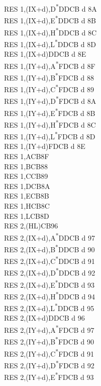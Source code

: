 \documentclass[twoside,openright,a4paper]{book}
\begin{document}
\begin{multicols}{3}
{\begin{tabbing}
	RES 1,(IX+d),D\textsuperscript{*}\>DDCB d 8A\\
	RES 1,(IX+d),E\textsuperscript{*}\>DDCB d 8B\\
	RES 1,(IX+d),H\textsuperscript{*}\>DDCB d 8C\\
	RES 1,(IX+d),L\textsuperscript{*}\>DDCB d 8D\\
	RES 1,(IX+d)\>DDCB d 8E\\
	RES 1,(IY+d),A\textsuperscript{*}\>FDCB d 8F\\
	RES 1,(IY+d),B\textsuperscript{*}\>FDCB d 88\\
	RES 1,(IY+d),C\textsuperscript{*}\>FDCB d 89\\
	RES 1,(IY+d),D\textsuperscript{*}\>FDCB d 8A\\
	RES 1,(IY+d),E\textsuperscript{*}\>FDCB d 8B\\
	RES 1,(IY+d),H\textsuperscript{*}\>FDCB d 8C\\
	RES 1,(IY+d),L\textsuperscript{*}\>FDCB d 8D\\
	RES 1,(IY+d)\>FDCB d 8E\\
	RES 1,A\>CB8F\\
	RES 1,B\>CB88\\
	RES 1,C\>CB89\\
	RES 1,D\>CB8A\\
	RES 1,E\>CB8B\\
	RES 1,H\>CB8C\\
	RES 1,L\>CB8D\\
	RES 2,(HL)\>CB96\\
	RES 2,(IX+d),A\textsuperscript{*}\>DDCB d 97\\
	RES 2,(IX+d),B\textsuperscript{*}\>DDCB d 90\\
	RES 2,(IX+d),C\textsuperscript{*}\>DDCB d 91\\
	RES 2,(IX+d),D\textsuperscript{*}\>DDCB d 92\\
	RES 2,(IX+d),E\textsuperscript{*}\>DDCB d 93\\
	RES 2,(IX+d),H\textsuperscript{*}\>DDCB d 94\\
	RES 2,(IX+d),L\textsuperscript{*}\>DDCB d 95\\
	RES 2,(IX+d)\>DDCB d 96\\
	RES 2,(IY+d),A\textsuperscript{*}\>FDCB d 97\\
	RES 2,(IY+d),B\textsuperscript{*}\>FDCB d 90\\
	RES 2,(IY+d),C\textsuperscript{*}\>FDCB d 91\\
	RES 2,(IY+d),D\textsuperscript{*}\>FDCB d 92\\
	RES 2,(IY+d),E\textsuperscript{*}\>FDCB d 93\\

\end{tabbing}}
\end{multicols}
\end{document}
